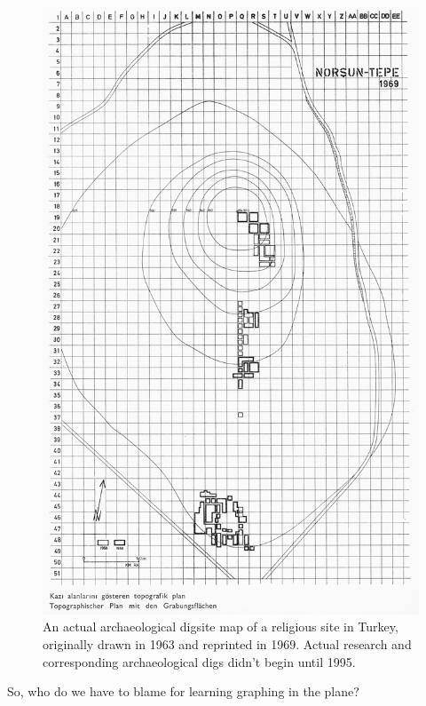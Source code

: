 \documentclass{ximera}
\begin{document}
        \begin{figure}[h]
            \begin{center}
                \includegraphics[scale=0.5]{archeologyGrid.jpg}
            \end{center}
            \caption{
                An actual archaeological digsite map of a religious site in Turkey, originally drawn in 1963 and reprinted in 1969. Actual research and corresponding archaeological digs didn't begin until 1995.
                }
            \label{gridMap}
        \end{figure}
        
    \begin{problem}
        So, who do we have to blame for learning graphing in the plane?
        \begin{multipleChoice}
        \end{multipleChoice}
    \end{problem}
    
\end{document}
